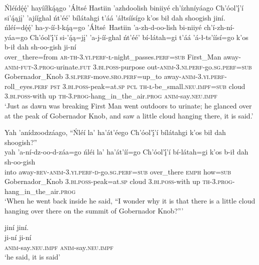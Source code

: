 \ea\label{ex:text5-2-2}
Ńléídę́ę́’ hayííłką́ągo ’Áłtsé Hastiin ’azhdoolish biniiyé ch’ízhníyáago Ch’óol’į́’í si’ą́ąjį’ ’ajííghal ńt’éé’ bílátahgi t’áá ’áłtsíísígo k’os bił dah shoogish jiní.\\
\gll ńléí=dę́ę́’	ha-y-íí-ł-ką́ą=go	’Áłtsé~{Hastiin}	’a-zh-d-oo-lish	bi-niiyé	ch’í-zh-ní-yáa=go	Ch’óol’į́’í	si-’ą́ą=jį’	’a-j-íí-ghal	ńt’éé’	bí-látah=gi	t’áá	’á-ł-ts’íísí=go	k’os	b-ił	dah	sh-oo-gish	ji-ní\\
     over\_there=from	\textsc{ar}-\textsc{th}-3.\textsc{yi}.\textsc{perf}-\textsc{ł}-night\_passes.\textsc{perf}=\textsc{sub}	First\_Man	away-\textsc{anim}-\textsc{fut}-3.\textsc{prog}-urinate.\textsc{fut}	3.\textsc{bi}.\textsc{poss}-purpose	out-\textsc{anim}-3.\textsc{ni}.\textsc{perf}-go.\textsc{sg}.\textsc{perf}=\textsc{sub}	Gobernador\_Knob	3.\textsc{si}.\textsc{perf}-move.\textsc{sro}.\textsc{perf}=up\_to	away-\textsc{anim}-3.\textsc{yi}.\textsc{perf}-roll\_eyes.\textsc{perf}	\textsc{pst}	3.\textsc{bi}.\textsc{poss}-peak=at.\textsc{sp}	\textsc{pcl}	\textsc{th}-\textsc{ł}-be\_small.\textsc{neu}.\textsc{impf}=\textsc{sub}	cloud	3.\textsc{bi}.\textsc{poss}-with	up	\textsc{th}-3.\textsc{prog}-hang\_in\_the\_air.\textsc{prog}	\textsc{anim}-say.\textsc{neu}.\textsc{impf}\\
\glt `Just as dawn was breaking First Man went outdoors to urinate; he glanced over at the peak of Gobernador Knob, and saw a little cloud hanging there, it is said.'
\z

\ea\label{ex:text5-2-3}
Yah ’anídzoodzáago, ``Ńléí la’ ha’át’éego Ch’óol’į́’í bílátahgi k’os bił dah shoogish?''\\
\gll yah	’a-ní-dz-oo-d-záa=go	ńléi	la’	ha’át’íí=go	Ch’óol’į́’í	bí-látah=gi	k’os	b-ił	dah	sh-oo-gish\\
     into	away-\textsc{rev}-\textsc{anim}-3.\textsc{yi}.\textsc{perf}-\textsc{d}-go.\textsc{sg}.\textsc{perf}=\textsc{sub}	over\_there	\textsc{emph}	how=\textsc{sub}	Gobernador\_Knob	3.\textsc{bi}.\textsc{poss}-peak=at.\textsc{sp}	cloud	3.\textsc{bi}.\textsc{poss}-with	up	\textsc{th}-3.\textsc{prog}-hang\_in\_the\_air.\textsc{prog}\\
\glt `When he went back inside he said, ``I wonder why it is that there is a little cloud hanging over there on the summit of Gobernador Knob?'''
\z

\ea\label{ex:text5-2-4}
jiní jiní.\\
\gll ji-ní	ji-ní\\
     \textsc{anim}-say.\textsc{neu}.\textsc{impf}	\textsc{anim}-say.\textsc{neu}.\textsc{impf}\\
\glt `he said, it is said'
\z

